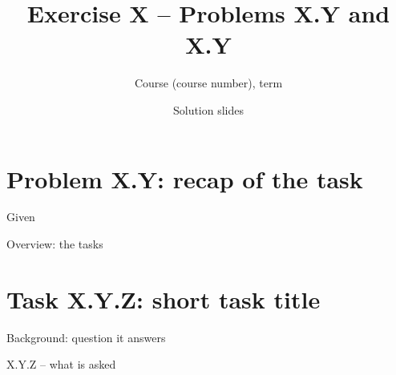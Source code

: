 \documentclass[aspectratio=169,11pt]{beamer}
\title{Exercise X -- Problems X.Y and X.Y}
\subtitle{Course (course number), term}
\date{Solution slides}
\begin{document}
\maketitle

\section{Problem X.Y: recap of the task}

\begin{frame}{Given}
\Given
\end{frame}

\begin{frame}{Overview: the tasks}\small
\Given
\end{frame}

\section{Task X.Y.Z: short task title}

\begin{frame}{Background: question it answers}
\Given
\end{frame}

\begin{frame}{X.Y.Z -- what is asked}\small
\Given
\end{frame}
\end{document}
